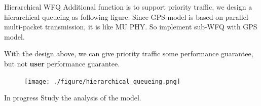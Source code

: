 \documentclass[10pt]{beamer}
\begin{document}
\begin{frame}{Hierarchical WFQ}
Additional function is to support priority traffic, we design a hierarchical queueing as following figure. 
Since GPS model is based on parallel multi-packet transmission, it is like MU PHY. 
So implement sub-WFQ with GPS model.

With the design above, we can give priority traffic some performance guarantee, but not \textbf{user} performance guarantee. 
\begin{figure}
\texttt{[image: ./figure/hierarchical\_queueing.png]}
\end{figure}
\end{frame}

\begin{frame}{In progress}
Study the analysis of the model. 
\end{frame}
%    
%    

\end{document}

